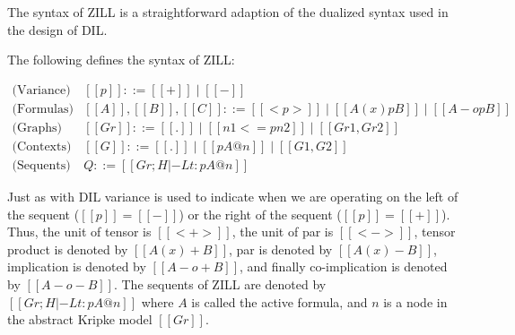 \documentclass[letterpaper,USenglish]{lipics-v2016}
\begin{document}
The syntax of ZILL is a straightforward adaption of the dualized
syntax used in the design of DIL.
\begin{definition}
  \label{def:syntax-ZILL}
  The following defines the syntax of ZILL:
  \begin{center}
    \begin{math}
      \begin{array}{lllll}
        \text{(Variance)}   & [[p]] ::= [[+]] \mid [[-]]\\
        \text{(Formulas)}   & [[A]],[[B]],[[C]] ::= [[< p >]] \mid [[A (x) p B]] \mid [[A -o p B]]\\
        \text{(Graphs)}     & [[Gr]] ::= [[.]] \mid [[n1 <=p n2]] \mid [[Gr1,Gr2]]\\
        \text{(Contexts)}   & [[G]] ::= [[.]] \mid [[p A @ n]] \mid [[G1,G2]]\\
        \text{(Sequents)}   & Q ::= [[Gr ; H |-L t : p A @ n]]
      \end{array}
    \end{math}
  \end{center}
\end{definition}
Just as with DIL variance is used to indicate when we are operating on
the left of the sequent ($[[p]] = [[-]]$) or the right of the sequent
($[[p]] = [[+]]$).  Thus, the unit of tensor is $[[<+>]]$, the unit of
par is $[[<->]]$, tensor product is denoted by $[[A (x)+ B]]$, par is
denoted by $[[A (x)- B]]$, implication is denoted by $[[A -o+ B]]$,
and finally co-implication is denoted by $[[A -o- B]]$.  The sequents
of ZILL are denoted by $[[Gr ; H |-L t : p A @ n]]$ where $A$ is called
the active formula, and $n$ is a node in the abstract Kripke model
$[[Gr]]$.
\end{document}
